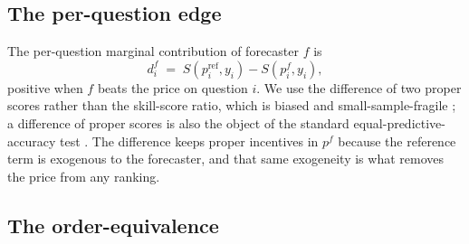 \documentclass[11pt]{article}
\begin{document}
\subsection{The per-question edge}
The per-question marginal contribution of forecaster $f$ is
\[ d_i^f \;=\; S\!\left(p^{\mathrm{ref}}_i, y_i\right) - S\!\left(p^f_i, y_i\right), \]
positive when $f$ beats the price on question $i$. We use the difference of two proper scores rather than the skill-score ratio, which is biased and small-sample-fragile \citep{wheatcroft2019}; a difference of proper scores is also the object of the standard equal-predictive-accuracy test \citep{diebold1995}. The difference keeps proper incentives in $p^f$ because the reference term is exogenous to the forecaster, and that same exogeneity is what removes the price from any ranking.

\subsection{The order-equivalence}
\label{sec:obs}
\end{document}
